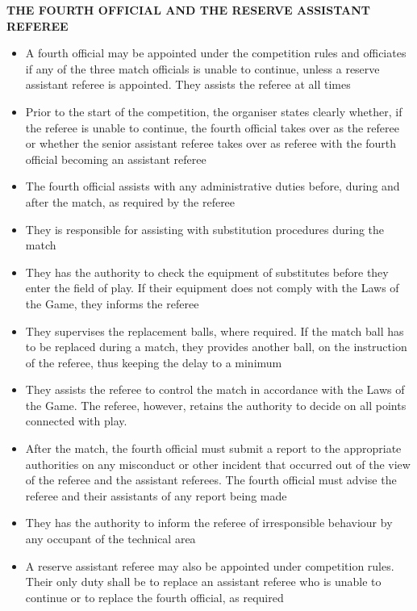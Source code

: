 \clearpage
\sffamily
{\bfseries\color[rgb]{0.4,0.4,0.4}THE FOURTH OFFICIAL AND THE RESERVE ASSISTANT REFEREE}
{}

\bigskip

\begin{itemize}
\item A fourth official may be appointed under the competition rules and officiates if any of the three match officials is unable to continue, unless a reserve assistant referee is appointed. They assists the referee at all times
\item Prior to the start of the competition, the organiser states clearly whether, if the referee is unable to continue, the fourth official takes over as the referee or whether the senior assistant referee takes over as referee with the fourth official becoming an assistant referee
\item The fourth official assists with any administrative duties before, during and after the match, as required by the referee
\item They is responsible for assisting with substitution procedures during the match
\item They has the authority to check the equipment of substitutes before they enter the field of play. If their equipment does not comply with the Laws of the Game, they informs the referee
\item They supervises the replacement balls, where required. If the match ball has to be replaced during a match, they provides another ball, on the instruction of the referee, thus keeping the delay to a minimum
\item They assists the referee to control the match in accordance with the Laws of the Game. The referee, however, retains the authority to decide on
all points connected with play.
\item After the match, the fourth official must submit a report to the appropriate authorities on any misconduct or other incident that occurred out of the view of the referee and the assistant referees. The fourth official must advise the referee and their assistants of any report being made
\item They has the authority to inform the referee of irresponsible behaviour by any occupant of the technical area
\item A reserve assistant referee may also be appointed under competition rules. Their  only duty shall be to replace an assistant referee who is unable to continue or to replace the fourth official, as required
\end{itemize}